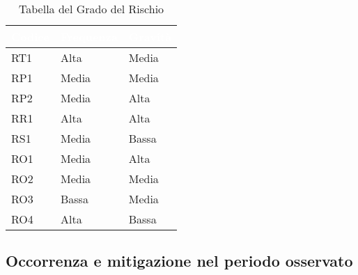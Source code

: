 {
\renewcommand{\arraystretch}{2}
\centering
	
\begin{longtable}{C{2cm} C{3cm} C{3cm}}
\caption{Tabella del Grado del Rischio}\\
	\textcolor{white}{\textbf{Codice}} & 
	\textcolor{white}{\textbf{Frequenza}} & 
	\textcolor{white}{\textbf{Gravità}}\\	
\endhead
		
		RT1 & Alta & Media\\
		
		RP1 & Media & Media\\
		
		RP2 & Media & Alta\\
		
		RR1 & Alta & Alta\\
		
		RS1 & Media & Bassa\\
		
		RO1 & Media & Alta\\
		
		RO2 & Media & Media\\
		
		RO3 & Bassa & Media\\
		
		RO4 & Alta & Bassa\\
		
	
	\end{longtable}
	
}

\newpage
\subsection{Occorrenza e mitigazione nel periodo osservato}


